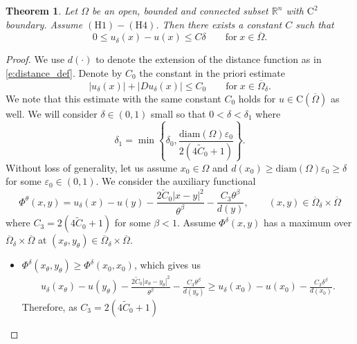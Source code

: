 \documentclass[11pt,reqno]{amsart}
\numberwithin{figure}{section}
\theoremstyle{plain}
\newtheorem{thm}{Theorem}[section]
\theoremstyle{remark}
\numberwithin{equation}{section}
\newcommand{\rmC}{\mathrm{C}}
\begin{document}
\begin{thm}\label{thm:conv_general} Let $\Omega$ be an open, bounded and connected subset $\mathbb{R}^n$ with $\mathrm{C}^2$ boundary. Assume $\mathrm{(H1)}-\mathrm{(H4)}$. 
Then there exists a constant $C$ such that
\begin{equation*}
    0\leq u_\delta(x) - u(x) \leq C\delta \qquad\text{for}\; x\in \overline{\Omega}.
\end{equation*}
\end{thm}
\begin{proof} We use $d(\cdot)$ to denote the extension of the distance function as in \eqref{e:distance_def}. Denote by $C_0$ the constant in the priori estimate
\begin{equation*}
    |u_\delta(x)| + |Du_\delta(x)|\leq C_0  \qquad\text{for}\;x\in \overline{\Omega}_\delta.
\end{equation*}
We note that this estimate with the same constant $C_0$ holds for $u\in \rmC(\overline{\Omega})$ as well. We will consider $\delta\in (0,1)$ small so that $0<\delta < \delta_1$ where 
\begin{equation*}
\delta_1 = \min\left\lbrace \delta_0,\frac{\mathrm{diam}(\Omega)\varepsilon_0}{2(4\tilde{C}_0+1)}\right\rbrace.    
\end{equation*}
Without loss of generality, let us assume $x_0\in \Omega$ and $d(x_0)\geq \mathrm{diam}(\Omega)\varepsilon_0\geq \delta$ for some $\varepsilon_0\in (0,1)$. We consider the auxiliary functional
\begin{equation*}
    \Phi^{\theta}(x,y) = u_\delta(x) - u(y) - \frac{2\tilde{C}_0\left|x-y\right|^2}{\theta^\beta} - \frac{C_3\theta^\beta}{d(y)}, \qquad(x,y)\in \overline{\Omega}_\delta\times \overline{\Omega}
\end{equation*}
where $C_3=2\left(4\tilde{C}_0+1\right)$ for some $\beta < 1$. Assume $\Phi^\delta(x,y)$ has a maximum over $\overline{\Omega}_\delta\times \overline{\Omega}$ at $(x_\theta,y_\theta)\in\overline{\Omega}_\delta\times \overline{\Omega}$.
\begin{itemize}
    \item $\Phi^\delta(x_\theta,y_\theta) \geq \Phi^\delta(x_0,x_0)$, which gives us
    \begin{align*}
        u_\delta(x_\theta) - u(y_\theta) - \frac{2\tilde{C}_0|x_\theta - y_\theta|^2}{\theta^\beta} - \frac{C_3\theta^\beta}{d(y_\theta)} \geq u_\delta(x_0) - u(x_0) - \frac{C_3\delta^\beta}{d(x_0)}. 
    \end{align*}
    Therefore, as $C_3 = 2(4\tilde{C}_0+1)$

\end{itemize}
\end{proof}
\end{document}
